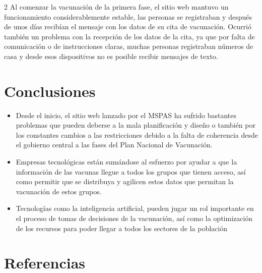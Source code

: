 \documentclass[12pt,spanish,Letterpaper,openany]{book}
\begin{document}
\begin {multicols}{2}
Al comenzar la vacunación de la primera fase, el sitio web mantuvo un funcionamiento
considerablemente estable, las personas se registraban y después de unos días recibían el
mensaje con los datos de su cita de vacunación. Ocurrió también un problema con la
recepción de los datos de la cita, ya que por falta de comunicación o de instrucciones claras,
muchas personas registraban números de casa y desde esos dispositivos no es posible recibir
mensajes de texto.

\hypertarget{conclusiones}{%
\section{Conclusiones}\label{conclusiones}}

\begin{itemize}
\item
  Desde el inicio, el sitio web lanzado por el MSPAS ha sufrido bastantes problemas
  que pueden deberse a la mala planificación y diseño o también por los constantes
  cambios a las restricciones debido a la falta de coherencia desde el gobierno central
  a las fases del Plan Nacional de Vacunación.
\item
  Empresas tecnológicas están sumándose al esfuerzo por ayudar a que la información
  de las vacunas llegue a todos los grupos que tienen acceso, así como permitir que se
  distribuya y agilicen estos datos que permitan la vacunación de estos grupos.
\item
  Tecnologías como la inteligencia artificial, pueden jugar un rol importante en el
  proceso de tomas de decisiones de la vacunación, así como la optimización de los
  recursos para poder llegar a todos los sectores de la población
\end{itemize}

\hypertarget{referencias}{%
\section{Referencias}\label{referencias}}


\end{multicols}
\end{document}

